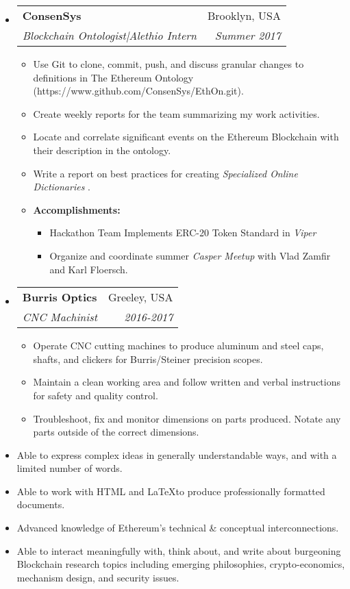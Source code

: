 \documentclass[letterpaper,10pt]{article}
\makeatletter
\newlength{\outerbordwidth}
\newcommand{\resitem}[1]{\item #1 \vspace{-2pt}}
\newcommand{\resheading}[1]{\vspace{8pt}
  \parbox{\textwidth}{\setlength{\FrameSep}{\outerbordwidth}
    \begin{shaded}
\setlength{\fboxsep}{0pt}\framebox[\textwidth][l]{\setlength{\fboxsep}{4pt}\fcolorbox{shadecolorB}{shadecolorB}{\textbf{\sffamily{\mbox{~}\makebox[6.762in][l]{\large #1} \vphantom{p\^{E}}}}}}
    \end{shaded}
  }\vspace{-5pt}
}
\newcommand{\ressubheading}[4]{
\begin{tabular*}{6.5in}{l@{\cftdotfill{\cftsecdotsep}\extracolsep{\fill}}r}
		\textbf{#1} & #2 \\
		\textit{#3} & \textit{#4} \\
\end{tabular*}\vspace{-6pt}}
\makeatother
\begin{document}
\begin{itemize}

	\item \ressubheading{ConsenSys}{Brooklyn, USA}{Blockchain Ontologist|Alethio Intern}{Summer 2017}

\begin{itemize}
	\resitem{Use Git to clone, commit, push, and discuss granular changes to definitions in The Ethereum Ontology (https://www.github.com/ConsenSys/EthOn.git).} 
	\resitem{Create weekly reports for the team summarizing my work activities.}
	\resitem{Locate and correlate significant events on the Ethereum Blockchain with their description in the ontology.}
	\resitem{Write a report on best practices for creating \textit{Specialized Online Dictionaries}}.
	\resitem{\textbf{Accomplishments:}}
		\begin{itemize}
				\resitem{Hackathon Team Implements ERC-20 Token Standard in \textit{Viper}}
				\resitem{Organize and coordinate summer \textit{Casper Meetup} with Vlad Zamfir and Karl Floersch.}
		\end{itemize}
\end{itemize}

\item \ressubheading{Burris Optics}{Greeley, USA}{CNC Machinist}{2016-2017}

	\begin{itemize}
		\resitem{Operate CNC cutting machines to produce aluminum and steel caps, shafts, and clickers for Burris/Steiner precision scopes.}
		\resitem{Maintain a clean working area and follow written and verbal instructions for safety and quality control.}
		\resitem{Troubleshoot, fix and monitor dimensions on parts produced. Notate any parts outside of the correct dimensions.}
	\end{itemize}

\end{itemize}


\resheading{Skills}

\begin{itemize}
	\resitem{Able to express complex ideas in generally understandable ways, and with a limited number of words.}
	\resitem{Able to work with \textsc{HTML} and \LaTeX to produce professionally formatted documents. }
		\resitem{Advanced knowledge of Ethereum's technical \& conceptual interconnections.}
	\resitem{Able to interact meaningfully with, think about, and write about burgeoning Blockchain research topics including emerging philosophies, crypto-economics, mechanism design, and security issues.}
\end{itemize}
\end{document}
